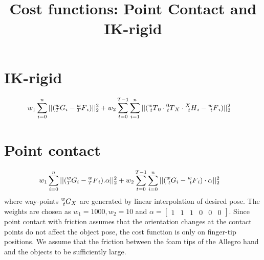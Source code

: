 \documentclass{article}
\title{\Large \bf Cost functions: Point Contact and IK-rigid}
\date{}
\begin{document}
\maketitle

\section{IK-rigid}
\label{sec:ik-rigid}
\begin{align*}
&w_1\sum_{i=0}^n||(\prescript{w}{T}{G}_i-\prescript{w}{T}{F}_{i})||_2^2+w_2\sum_{t=0}^{T-1}\sum_{i=1}^n||(\prescript{w}{t}{T}_0\cdot\prescript{0}{t}{T}_{X}\cdot\prescript{X}{t}{H}_{i}-\prescript{w}{t}{F}_{i})||_2^2  
\end{align*}


\section{Point contact}
\label{sec:point-contact}
\begin{align*} &w_1\sum_{i=0}^n||(\prescript{w}{T}{G}_i-\prescript{w}{T}{F}_{i}).\alpha||_2^2+w_2\sum_{t=0}^{T-1}\sum_{i=0}^n||(\prescript{w}{t}{G}_i-\prescript{w}{t}{F}_{i})\cdot \alpha||_2^2
\end{align*}
where way-points $\prescript{w}{t}{G}_X$ are generated by linear interpolation of desired pose. The weights are chosen as $w_1=1000,w_2=10$ and $\alpha=\begin{bmatrix} 1 & 1 & 1 & 0 & 0 & 0\end{bmatrix}$. Since point contact with friction assumes that the orientation changes at the contact points do not affect the object pose, the cost function is only on finger-tip positions. We assume that the friction between the foam tips of the Allegro hand and the objects to be sufficiently large.
\end{document}
